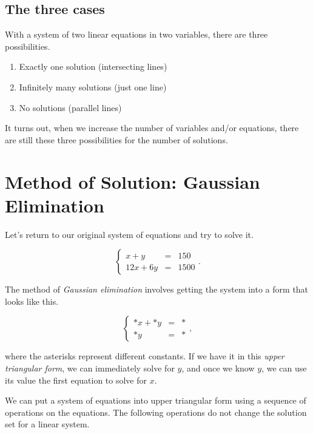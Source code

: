 \documentclass[
]{book}
\providecommand{\tightlist}{%
  \setlength{\itemsep}{0pt}\setlength{\parskip}{0pt}}
\theoremstyle{definition}
\theoremstyle{definition}
\theoremstyle{definition}
\theoremstyle{definition}
\theoremstyle{remark}
\begin{document}
\subsection*{The three cases}\label{the-three-cases}

With a system of two linear equations in two variables, there are three possibilities.

\begin{enumerate}
\def\labelenumi{\arabic{enumi}.}
\tightlist
\item
  Exactly one solution (intersecting lines)
\item
  Infinitely many solutions (just one line)
\item
  No solutions (parallel lines)
\end{enumerate}

It turns out, when we increase the number of variables and/or equations, there are still these three possibilities for the number of solutions.

\section{Method of Solution: Gaussian Elimination}\label{GE}

Let's return to our original system of equations and try to solve it.

\begin{equation*}
\left\{ 
\begin{array}{ccl}
x+y&=&150\\
    12x+6y&=&1500
\end{array}\right. .
\end{equation*}

The method of \emph{Gaussian elimination} involves getting the system into a form that looks like this.

\begin{equation*}
\left\{ 
\begin{array}{rcl}
*x+*y & = &* \\
    *y & = & *
\end{array}\right. ,
\end{equation*}

where the asterisks represent different constants. If we have it in this \emph{upper triangular form}, we can immediately solve for \(y\), and once we know \(y\), we can use its value the first equation to solve for \(x\).

We can put a system of equations into upper triangular form using a sequence of operations on the equations. The following operations do not change the solution set for a linear system.
\end{document}
